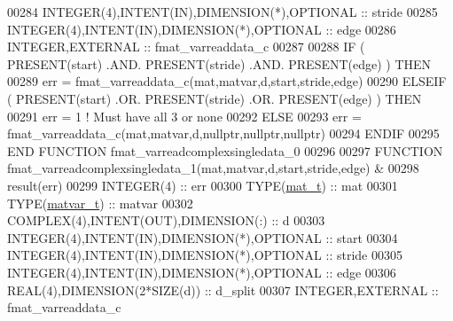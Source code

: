 \begin{DoxyCode}
00284     \textcolor{keywordtype}{INTEGER(4)},\textcolor{keywordtype}{INTENT(IN)},\textcolor{keywordtype}{DIMENSION(*)},\textcolor{keywordtype}{OPTIONAL} :: stride
00285     \textcolor{keywordtype}{INTEGER(4)},\textcolor{keywordtype}{INTENT(IN)},\textcolor{keywordtype}{DIMENSION(*)},\textcolor{keywordtype}{OPTIONAL} :: edge
00286     \textcolor{keywordtype}{INTEGER},\textcolor{keywordtype}{EXTERNAL}                            :: fmat\_varreaddata\_c
00287 
00288     \textcolor{keywordflow}{IF} ( \textcolor{keyword}{PRESENT}(start) .AND. \textcolor{keyword}{PRESENT}(stride) .AND. \textcolor{keyword}{PRESENT}(edge) ) \textcolor{keywordflow}{THEN}
00289         err = fmat\_varreaddata\_c(mat,matvar,d,start,stride,edge)
00290     \textcolor{keywordflow}{ELSEIF} ( \textcolor{keyword}{PRESENT}(start) .OR. \textcolor{keyword}{PRESENT}(stride) .OR. \textcolor{keyword}{PRESENT}(edge) ) \textcolor{keywordflow}{THEN}
00291         err = 1    \textcolor{comment}{! Must have all 3 or none}
00292     \textcolor{keywordflow}{ELSE}
00293         err = fmat\_varreaddata\_c(mat,matvar,d,nullptr,nullptr,nullptr)
00294 \textcolor{keywordflow}{    ENDIF}
00295 \textcolor{keyword}{END FUNCTION }fmat\_varreadcomplexsingledata\_0
00296 
00297 \textcolor{keyword}{FUNCTION }fmat\_varreadcomplexsingledata\_1(mat,matvar,d,start,stride,edge) &
00298                                                              result(err)
00299     \textcolor{keywordtype}{INTEGER(4)}                                  :: err
00300     \textcolor{keywordtype}{TYPE}(\hyperlink{group___m_a_t_gab0fc888f5a5d79943b16284b1f91c2e8}{mat\_t})                                 :: mat
00301     \textcolor{keywordtype}{TYPE}(\hyperlink{group___m_a_t_structmatvar__t}{matvar\_t})                              :: matvar
00302     \textcolor{keywordtype}{COMPLEX(4)},\textcolor{keywordtype}{INTENT(OUT)},\textcolor{keywordtype}{DIMENSION(:)}     :: d
00303     \textcolor{keywordtype}{INTEGER(4)},\textcolor{keywordtype}{INTENT(IN)},\textcolor{keywordtype}{DIMENSION(*)},\textcolor{keywordtype}{OPTIONAL} :: start
00304     \textcolor{keywordtype}{INTEGER(4)},\textcolor{keywordtype}{INTENT(IN)},\textcolor{keywordtype}{DIMENSION(*)},\textcolor{keywordtype}{OPTIONAL} :: stride
00305     \textcolor{keywordtype}{INTEGER(4)},\textcolor{keywordtype}{INTENT(IN)},\textcolor{keywordtype}{DIMENSION(*)},\textcolor{keywordtype}{OPTIONAL} :: edge
00306     \textcolor{keywordtype}{REAL(4)},\textcolor{keywordtype}{DIMENSION(2*SIZE(d))}       :: d\_split
00307     \textcolor{keywordtype}{INTEGER},\textcolor{keywordtype}{EXTERNAL}                            :: fmat\_varreaddata\_c

\end{DoxyCode}
